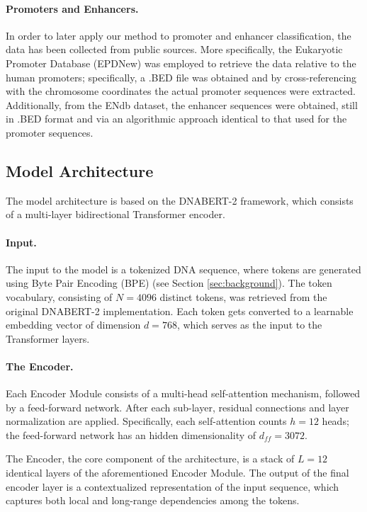 \documentclass[11pt,a4paper,twoside]{article}
\begin{document}
\paragraph{Promoters and Enhancers.}
In order to later apply our method to promoter and enhancer classification, the data has been collected from public sources.
More specifically, the Eukaryotic Promoter Database (EPDNew) \cite{epdnew} was employed to retrieve the data relative to the human promoters; specifically, a .BED file was obtained and by cross-referencing with the chromosome coordinates the actual promoter sequences were extracted.
Additionally, from the ENdb \cite{endb} dataset, the enhancer sequences were obtained, still in .BED format and via an algorithmic approach identical to that used for the promoter sequences.

\subsection{Model Architecture}
The model architecture is based on the DNABERT-2 framework, which consists of a multi-layer bidirectional Transformer encoder. 

\paragraph{Input.}
The input to the model is a tokenized DNA sequence, where tokens are generated using Byte Pair Encoding (BPE) (see Section \ref{sec:background}). 
The token vocabulary, consisting of $N = 4096$ distinct tokens, was retrieved from the original DNABERT-2 implementation.
Each token gets converted to a learnable embedding vector of dimension $d = 768$, which serves as the input to the Transformer layers.

\paragraph{The Encoder.}
Each Encoder Module consists of a multi-head self-attention mechanism, followed by a feed-forward network.
After each sub-layer, residual connections and layer normalization are applied.
Specifically, each self-attention counts $h = 12$ heads; the feed-forward network has an hidden dimensionality of $d_{ff} = 3072$.

The Encoder, the core component of the architecture, is a stack of $L = 12$ identical layers of the aforementioned Encoder Module.
The output of the final encoder layer is a contextualized representation of the input sequence, which captures both local and long-range dependencies among the tokens.
\end{document}
